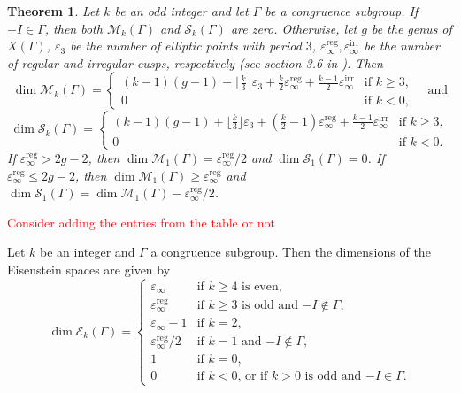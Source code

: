 \documentclass[10pt,leqno,twoside]{article}
\theoremstyle{plain}
\newtheorem{theorem}[lem]{Theorem}
\theoremstyle{definition}
\numberwithin{equation}{section}
\numberwithin{lem}{section}
\newcommand{\sai}[1]{\textcolor{red}{#1}}
\begin{document}
\begin{theorem}
    Let $k$ be an odd integer and let $\varGamma$ be a congruence subgroup. If $-I\in\varGamma$, then both $\mathcal M_k(\varGamma)$ and $\mathcal S_k(\varGamma)$ are zero. Otherwise, let $g$ be the genus of $X(\varGamma)$, $\varepsilon_3$ be the number of elliptic points with period $3$, $\varepsilon_\infty^{\mathrm{reg}}, \varepsilon_\infty^{\mathrm{irr}}$ be the number of regular and irregular cusps, respectively \textup{(}see section 3.6 in \cite{diamond}\textup{)}. Then 
    \[\dim \mathcal M_k(\varGamma) = \begin{cases}
        (k-1)(g-1) + \lfloor\frac{k}{3}\rfloor\varepsilon_3 + \frac{k}{2}\varepsilon_\infty^{\mathrm{reg}} + \frac{k-1}{2}\varepsilon_\infty^{\mathrm{irr}} & \text{if $k\geq 3$},\\
        0 & \text{if $k<0$},
    \end{cases}\quad \text{and}\]
    \[\dim \mathcal S_k(\varGamma) = \begin{cases}
        (k-1)(g-1) + \lfloor\frac{k}{3}\rfloor\varepsilon_3 + (\frac{k}{2}-1)\varepsilon_\infty^{\mathrm{reg}} + \frac{k-1}{2}\varepsilon_\infty^{\mathrm{irr}} & \text{if $k\geq 3$},\\
        0 & \text{if $k<0$}.
    \end{cases}\] If $\varepsilon_\infty^{\mathrm{reg}}>2g-2$, then $\dim \mathcal M_1(\varGamma) = \varepsilon_\infty^{\mathrm{reg}}/2$ and $\dim \mathcal S_1(\varGamma) = 0$. If $\varepsilon_\infty^{\mathrm{reg}}\leq 2g-2$, then $\dim \mathcal M_1(\varGamma)\geq \varepsilon_\infty^{\mathrm{reg}}$ and $\dim \mathcal S_1(\varGamma) = \dim \mathcal M_1(\varGamma)- \varepsilon_\infty^{\mathrm{reg}}/2$.
\end{theorem}

\sai{Consider adding the entries from the table or not}

Let $k$ be an integer and $\varGamma$ a congruence subgroup. Then the dimensions of the Eisenstein spaces are given by 
\[\dim \mathcal E_k(\varGamma) = \begin{cases}
    \varepsilon_\infty & \text{if $k\geq 4$ is even},\\
    \varepsilon_\infty^{\mathrm{reg}} & \text{if $k\geq 3$ is odd and $-I\not\in\varGamma$},\\
    \varepsilon_\infty-1 & \text{if $k=2$},\\
    \varepsilon_\infty^{\mathrm{reg}}/2 & \text{if $k=1$ and $-I\not\in\varGamma$},\\
    1 & \text{if $k=0$},\\
    0 & \text{if $k<0$, or if $k>0$ is odd and $-I\in\varGamma$}.
\end{cases}\]
\end{document}
